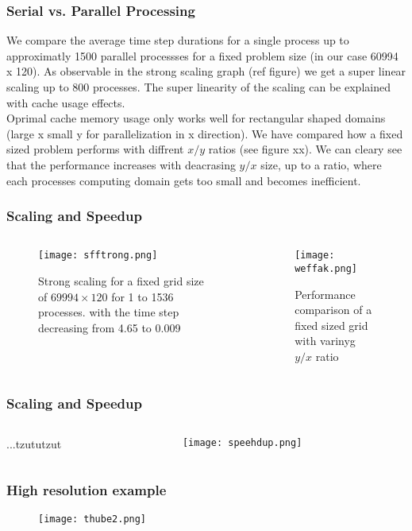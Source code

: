 \documentclass{beamer}
\begin{document}
%
%
%
\begin{frame}
\frametitle{Serial vs. Parallel Processing}
\justify
We compare the average time step durations for a single process up to approximatly 1500 parallel processses for a fixed problem size (in our case 60994 x 120). As observable in the strong scaling graph (ref figure) we get a super linear scaling up to 800 processes. 
The super linearity of the scaling can be explained with cache usage effects. \\
\vspace{2mm}
Oprimal cache memory usage only works well for rectangular shaped domains (large x small y for parallelization in x direction). We have compared how a fixed sized problem performs with diffrent $x/y$ ratios (see figure xx). We can cleary see that the performance increases with deacrasing $y/x$ size, up to a ratio, where each processes computing domain gets too small and becomes inefficient. 
\end{frame}
%
%
%
\begin{frame}
\frametitle{Scaling and Speedup}
\begin{minipage}[1\textheight]{\textwidth}
\begin{columns}[T]
\begin{column}{0.5\textwidth}
\begin{figure}
\texttt{[image: sfftrong.png]}
\caption{Strong scaling for a fixed grid size of $69994\times 120$ for 1 to 1536 processes. with the time step decreasing from 4.65 to 0.009}
\end{figure}
\end{column}
\begin{column}{0.5\textwidth}
\begin{figure}
\texttt{[image: weffak.png]}
\caption{Performance comparison of a fixed sized grid with varinyg $y/x$ ratio}
\end{figure}
\end{column}
\end{columns}
\end{minipage}
\end{frame}
%
%
%
\begin{frame}
\frametitle{Scaling and Speedup}
\begin{minipage}[1\textheight]{\textwidth}
\begin{columns}[T]
\begin{column}{0.5\textwidth}
\vspace{5mm}
\justify
...tzututzut
\end{column}
\begin{column}{0.5\textwidth}
\begin{figure}
\texttt{[image: speehdup.png]}
\caption{}
\end{figure}
\end{column}
\end{columns}
\end{minipage}
\end{frame}
%
%
%
\begin{frame}
\frametitle{High resolution example}
\justify

\begin{figure}
\texttt{[image: thube2.png]}
\end{figure}
\end{frame}
%
%
%
\end{document}
